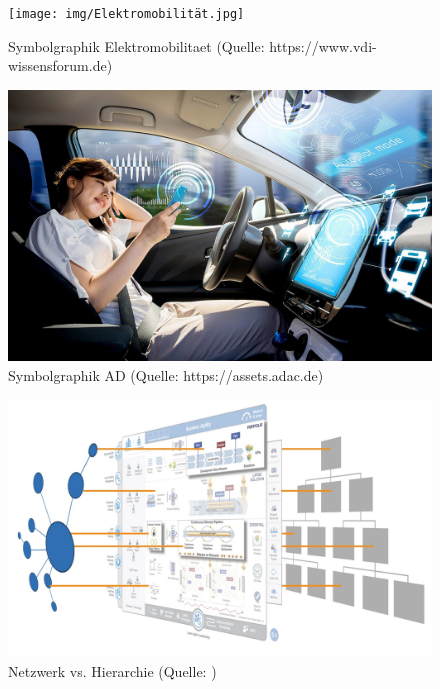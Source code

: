 \begin{figure}[htb]
	\centering
	\texttt{[image: img/Elektromobilität.jpg]}
	\caption[Symbolgraphik Elektromobilitaet (Quelle: https://www.vdi-wissensforum.de)]{Symbolgraphik Elektromobilitaet (Quelle: https://www.vdi-wissensforum.de)}
	\label{fig:Elektromobilitaet}
\end{figure}

\begin{figure}[htb]
	\centering
	\includegraphics[width=\textwidth]{img/AD.jpg}
	\caption[Symbolgraphik AD (Quelle: https://assets.adac.de)]{Symbolgraphik AD (Quelle: https://assets.adac.de)}
	\label{fig:AD}
\end{figure}

\begin{figure}[htb]
	\centering
	\includegraphics[width=\textwidth]{img/netzwerk_hirarchie.jpg}
	\caption[Netzwerk vs. Hierarchie (Quelle: \cite{SAFe})]{Netzwerk vs. Hierarchie (Quelle: \cite{SAFe})}
	\label{fig:SAFeNetworkHirarchy}
\end{figure}

